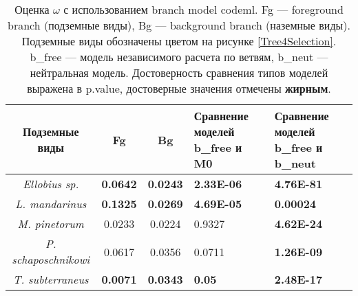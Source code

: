 \begin{table}[h!]
	\caption{Оценка $\omega$ с использованием branch model codeml. Fg --- foreground branch (подземные виды), Bg --- background branch (наземные виды). Подземные виды обозначены цветом на рисунке \ref{Tree4Selection}. b\_free --- модель независимого расчета по ветвям, b\_neut --- нейтральная модель. Достоверность сравнения типов моделей выражена в p.value, достоверные значения отмечены \textbf{жирным}.}\label{PAMLtable}
	\vspace{5mm}
	
\begin{center}
\begin{tabular}{|c|c|c|p{4.5cm}|p{4.5cm}|}
	\hline 
\textbf{Подземные виды} & \textbf{Fg} & \textbf{Bg} & \textbf{Сравнение моделей b\_free и M0} & \textbf{Сравнение моделей b\_free и b\_neut}\\ \hline
\textit{Ellobius sp.} & \textbf{0.0642} & \textbf{0.0243} & \textbf{2.33E-06} & \textbf{4.76E-81}\\ \hline
\textit{L. mandarinus} & \textbf{0.1325} & \textbf{0.0269} & \textbf{4.69E-05} & \textbf{0.00024}\\ \hline
\textit{M. pinetorum} & 0.0233 & 0.0224 & 0.9327 & \textbf{4.62E-24}\\ \hline
\textit{P. schaposchnikowi} & 0.0617 & 0.0356 & 0.0711 & \textbf{1.26E-09}\\ \hline
\textit{T. subterraneus} & \textbf{0.0071} & \textbf{0.0343} & \textbf{0.05} & \textbf{2.48E-17}\\ \hline
\end{tabular} 
\end{center}
\end{table}


